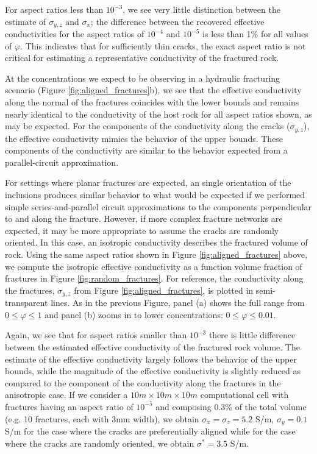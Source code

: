 

For aspect ratios less than $10^{-3}$, we see very little distinction between the estimate of $\sigma_{y, z}$ and $\sigma_{x}$; the difference between the recovered effective conductivities for the aspect ratios of $10^{-4}$ and $10^{-5}$ is less than 1\% for all values of $\varphi$. This indicates that for sufficiently thin cracks, the exact aspect ratio is not critical for estimating a representative conductivity of the fractured rock.

At the concentrations we expect to be observing in a hydraulic fracturing scenario (Figure \ref{fig:aligned_fractures}b), we see that the effective conductivity along the normal of the fractures coincides with the lower bounds and remains nearly identical to the conductivity of the host rock for all aspect ratios shown, as may be expected. For the components of the conductivity along the cracks ($\sigma_{y, z}$), the effective conductivity mimics the behavior of the upper bounds. These components of the conductivity are similar to the behavior expected from a parallel-circuit approximation.

For settings where planar fractures are expected, an single orientation of the inclusions produces similar behavior to what would be expected if we performed simple series-and-parallel circuit approximations to the components perpendicular to and along the fracture. However, if more complex fracture networks are expected, it may be more appropriate to assume the cracks are randomly oriented. In this case, an isotropic conductivity describes the fractured volume of rock. Using the same aspect ratios shown in Figure \ref{fig:aligned_fractures} above, we compute the isotropic effective conductivity as a function volume fraction of fractures in Figure \ref{fig:random_fractures}. For reference, the conductivity along the fractures, $\sigma_{y, z}$ from Figure \ref{fig:aligned_fractures}, is plotted in semi-transparent lines. As in the previous Figure, panel (a) shows the full range from $0 \leq \varphi \leq 1$ and panel (b) zooms in to lower concentrations: $0 \leq \varphi \leq 0.01$.



Again, we see that for aspect ratios smaller than $10^{-3}$ there is little difference between the estimated effective conductivity of the fractured rock volume. The estimate of the effective conductivity largely follows the behavior of the upper bounds, while the magnitude of the effective conductivity is slightly reduced as compared to the component of the conductivity along the fractures in the anisotropic case. If we consider a $10m \times 10m \times 10m$ computational cell with fractures having an aspect ratio of $10^{-5}$ and composing 0.3\% of the total volume (e.g. 10 fractures, each with 3mm width), we obtain $\sigma_x = \sigma_z = 5.2$ S/m, $\sigma_y = 0.1$ S/m for the case where the cracks are preferentially aligned while for the case where the cracks are randomly oriented, we obtain $\sigma^* = 3.5$ S/m.

